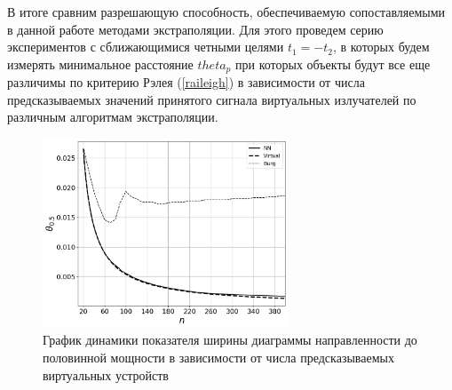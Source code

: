 \documentclass{article}
\begin{document}
	\begin{figure}[h]
		\centering
		\caption{}
		\label{fig:7}
	\end{figure}	
	
	В итоге сравним разрешающую способность, обеспечиваемую сопоставляемыми в данной работе методами экстраполяции. Для этого проведем серию экспериментов с сближающимися четными целями $t_1 = -t_2$, в которых будем измерять минимальное расстояние $theta_{p}$ при которых объекты будут все еще различимы по критерию Рэлея (\ref{raileigh}) в зависимости от числа предсказываемых значений принятого сигнала виртуальных излучателей по различным алгоритмам экстраполяции.
	
	\begin{figure}[h]
		\centering
		\includegraphics[width=0.65\textwidth]{berg_NN_theta_compare.png}
		\caption{График динамики показателя ширины диаграммы направленности до половинной мощности в зависимости от числа предсказываемых виртуальных устройств}
		\label{fig:8}
	\end{figure}	
	
\end{document}
